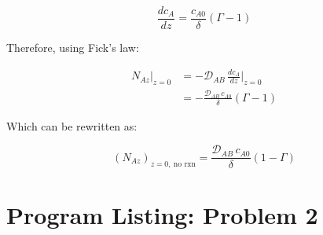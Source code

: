 \documentclass[letterpaper,12pt]{article}
\begin{document}
\begin{equation}
    \frac{dc_A}{dz} = \frac{c_{A0}}{\delta}\left(\Gamma - 1\right)
\end{equation}

Therefore, using Fick's law:

\begin{equation}
\begin{aligned}
    N_{Az}\big|_{z=0} &= -\mathcal{D}_{AB}\,\frac{dc_A}{dz}\bigg|_{z=0} \\
                      &= -\frac{\mathcal{D}_{AB}\, c_{A0}}{\delta}\left(\Gamma - 1\right)
\end{aligned}
\end{equation}

Which can be rewritten as:

\begin{equation}
\boxed{
    \left(N_{Az}\right)_{z=0,\ \text{no rxn}} = \frac{\mathcal{D}_{AB}\, c_{A0}}{\delta}\left(1 - \Gamma\right)
}
\end{equation}


\newpage
\section*{Program Listing: Problem 2}


\end{document}
